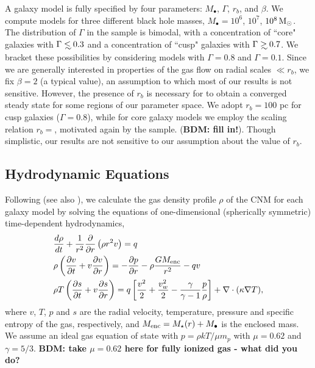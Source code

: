 \documentclass[usenatbib,fleqn]{mn2e}
\newcommand\lsim{\mathrel{\rlap{\lower4pt\hbox{\hskip1pt$\sim$}}
    \raise1pt\hbox{$<$}}}
\newcommand\gsim{\mathrel{\rlap{\lower4pt\hbox{\hskip1pt$\sim$}}
    \raise1pt\hbox{$>$}}}
\newcommand{\rb}{r_b}
\newcommand{\dxdy}[2]{\frac{d #1}{d #2} }
\newcommand{\drhodt}{\dxdy{\rho}{t}}
\newcommand{\ke}{\frac{v^2}{2}}
\newcommand{\kew}{\frac{v_w^2}{2}}
\newcommand{\gammaf}{\frac{\gamma}{\gamma-1}}
\newcommand{\cs}{\frac{p}{\rho}}
\newcommand{\Mbh}[1][]{M_{\bullet#1}}
\begin{document}
A galaxy model is fully specified by four parameters: $\Mbh$, $\Gamma$, $r_b$,
and $\beta$.  We compute models for three different black hole masses, $\Mbh = 10^6$, $10^7$, $10^8 \,{\rm M_\odot}$.  The distribution of $\Gamma$ in the \citet{LauerFaber+:2007a} sample is bimodal, with a concentration of ``core" galaxies with $\Gamma \lsim 0.3$ and a concentration of ``cusp" galaxies with $\Gamma \gsim 0.7$.  We bracket these possibilities by considering models with $\Gamma=0.8$ and $\Gamma=0.1$.  Since we are generally interested in properties of the gas flow on radial scales $\ll r_b$, we fix $\beta = 2$ (a typical value), an assumption to which most of our results is not sensitive.  However, the presence of $\rb$ is necessary for to obtain a converged steady state for some regions of our parameter space. We adopt $\rb=100$ pc for cusp galaxies ($\Gamma=0.8$), while for core galaxy models we employ the scaling relation $\rb = $, motivated again by the \citet{LauerFaber+:2007a} sample. ({\bf BDM: fill in!}).  Though simplistic, our results are not sensitive to our assumption about the value of $\rb$.

\subsection{Hydrodynamic Equations}
\label{sec:hydro}

Following \citet{Quataert:2004a} (see also \citealt{HolzerAxford:1970a,De-ColleGuillochon+:2012a,ShcherbakovWong+:2014a}), we calculate the gas density profile $\rho$ of the CNM for each galaxy model by solving the equations of one-dimensional (spherically symmetric) time-dependent hydrodynamics,
\begin{align}
  &\drhodt+\frac{1}{r^2}\frac{\partial}{\partial r}\left(\rho r^2 v\right)=q \label{eq:drhodt}\\
  &\rho \left(\frac{\partial v}{\partial t} + v\frac{\partial
      v}{\partial r}\right) =-\frac{\partial p}{\partial r}- \rho\frac{GM_{\rm enc}}{r^{2}} -q v \label{eq:dvdt}\\
  &\rho T\left(\frac{\partial s}{\partial t} + v\frac{\partial
      s}{\partial r}\right)=q\left[\ke+\kew-\gammaf \cs \right] +\nabla\cdot(\kappa \nabla T)
, 
\label{eq:dsdt}
\end{align}
where $v$, $T$, $p$ and $s$ are the radial velocity, temperature,
pressure and specific entropy of the gas, respectively, and $M_{\rm enc} = M_{\star}(r) + \Mbh$ is the
enclosed mass.  We assume an ideal gas equation of state with $p =
\rho kT/\mu m_p$ with $\mu = 0.62$  and $\gamma = 5/3$. {\bf BDM: take $\mu = 0.62$ here for fully ionized gas - what did you do?}
\end{document}
